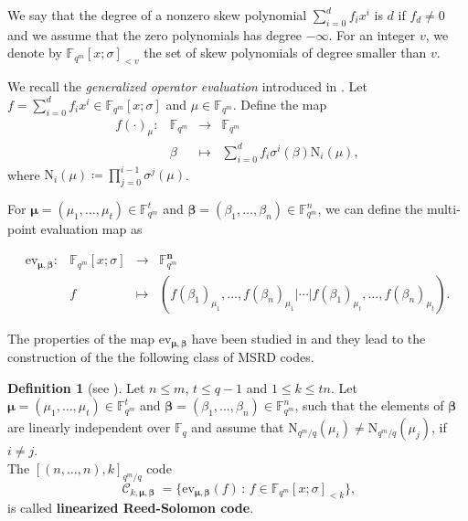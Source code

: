 \documentclass[11pt]{amsart}
\DeclareMathOperator{\C}{\mathcal{C}}
\theoremstyle{definition}
\newtheorem{definition}[theorem]{Definition}
\newcommand{\F}{{\mathbb F}}
\newcommand{\muu}{{\boldsymbol{\mu}}}
\newcommand{\bfn}{\mathbf {n}}
\newcommand{\fq}{{\mathbb F}_{q}}
\newcommand{\N}{\mathrm{N}}
\newcommand{\st}{\,:\,}
\begin{document}
 We say that the degree of a nonzero skew polynomial $\sum_{i=0}^d f_i x^i$ is $d$ if $f_d \neq 0$ and we assume that the zero polynomials has degree $-\infty$. For an integer $v$, we denote by $\F_{q^m}[x; \sigma]_{<v}$ the set of skew polynomials of degree smaller than $v$.


We recall the \emph{generalized operator evaluation} introduced in \cite{leroy1995pseudolinear}.
Let $f=\sum_{i=0}^d f_i x^i \in \F_{q^m}[x; \sigma]$ and $\mu \in \F_{q^m}$. Define the map
\[
\begin{array}{rccl}
f(\cdot)_{\mu}: & \F_{q^m}  & \longrightarrow & \F_{q^m} \\
& \beta & \longmapsto & \sum\limits_{i =0}^d f_i \sigma^i(\beta)\N_i(\mu),
\end{array} 
\]
where $\N_i(\mu)\coloneqq\prod_{j=0}^{i-1}\sigma^j(\mu)$. 

For $\boldsymbol{\mu}=(\mu_1,\ldots,\mu_t) \in \F_{q^m}^t$ and $\boldsymbol{\beta}=(\beta_1,\ldots,\beta_n) \in \F_{q^m}^n$, we can define the multi-point evaluation map as 

\[
\begin{array}{rccl}
\mathrm{ev}_{\muu,\boldsymbol{\beta}}: & \F_{q^m}[x;\sigma] & \longrightarrow & \F_{q^m}^\bfn \\
&f  & \longmapsto &  (f(\beta_1)_{\mu_1},\ldots,f(\beta_n)_{\mu_1} \lvert   \cdots \lvert  f(\beta_1)_{\mu_t},\ldots, f(\beta_n)_{\mu_t}).
\end{array} 
\]




The properties of the map $\mathrm{ev}_{\muu,\boldsymbol{\beta}}$ have been studied in \cite{Martinez2018skew} and they lead to the construction of the the following class of MSRD codes.

\begin{definition}[see \textnormal{\cite[Definition 31]{Martinez2018skew}}]\label{def:linRScodes}
Let $n \leq m$, $t \leq q-1$ and $1 \leq k \leq tn$. Let $\boldsymbol{\mu}=(\mu_1,\ldots,\mu_t) \in \F_{q^m}^t$ and $\boldsymbol{\beta}=(\beta_1,\ldots,\beta_n) \in \F_{q^m}^n$, such that the elements of $\boldsymbol{\beta}$ are linearly independent over $\F_q$ and assume that $\N_{q^m/q}(\mu_i)\neq \N_{q^m/q}(\mu_j)$, if $i \neq j$. \\
The $[(n,\ldots,n),k]_{q^m/q}$ code
\[
\C_{k,\muu,\boldsymbol{\beta}}=\{ \mathrm{ev}_{\muu,\boldsymbol{\beta}}(f) \st f \in \F_{q^m}[x;\sigma]_{<k} \}, 
\]
is called \textbf{linearized Reed-Solomon code}.
\end{definition}
\end{document}
